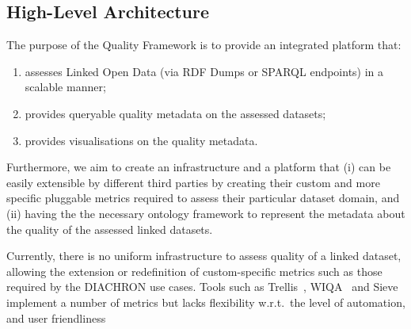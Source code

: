 
\subsection{High-Level Architecture}
\label{sec:HLA} 

The purpose of the Quality Framework is to provide an integrated platform that: 
\begin{enumerate}
\item assesses Linked Open Data (via RDF Dumps or SPARQL endpoints) in a scalable manner;
\item provides queryable quality metadata on the assessed datasets;
\item provides visualisations on the quality metadata.
\end{enumerate}
Furthermore, we aim to create an infrastructure and a platform that (i) can be easily extensible by different third parties by creating their custom and more specific pluggable metrics required to assess their particular dataset domain, and (ii) having the the necessary ontology framework to represent the metadata about the quality of the assessed linked datasets.

Currently, there is no uniform infrastructure to assess quality of a linked dataset, allowing the extension or redefinition of custom-specific metrics such as those required by the DIACHRON use cases.
Tools such as Trellis~\cite{Gil2002}, WIQA~\cite{Bizer2008:PhDThesis:biblatex} and Sieve~\cite{Mendes2012} implement a number of metrics but lacks flexibility w.r.t.\ the level of automation, and user friendliness~\cite{Zaveri2012:LODQ} 

